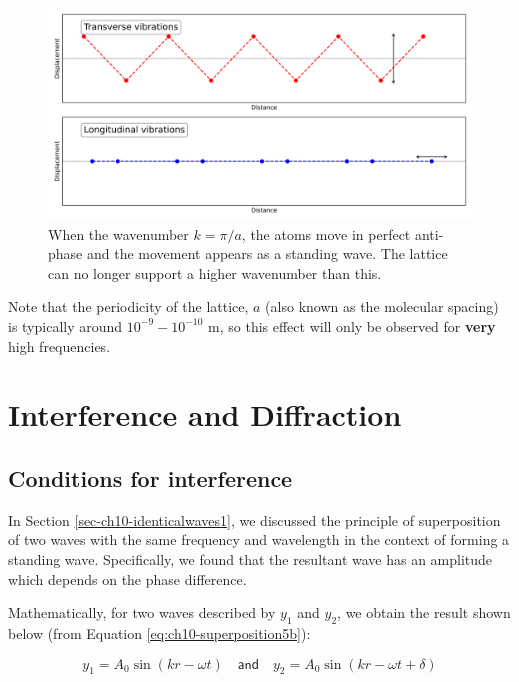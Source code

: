 \documentclass[
]{book}
\begin{document}
\begin{figure}

{\centering \includegraphics[width=0.7\linewidth]{visualisations/ch12-phonons2} 

}

\caption{When the wavenumber $k = \pi / a$, the atoms move in perfect anti-phase and the movement appears as a standing wave. The lattice can no longer support a higher wavenumber than this.}\label{fig:ch12-dispersionlattice1}
\end{figure}

Note that the periodicity of the lattice, \(a\) (also known as the molecular spacing) is typically around \(10^{-9} - 10^{-10}\) m, so this effect will only be observed for \textbf{very} high frequencies.

\hypertarget{sec-ch13-interference}{%
\chapter{Interference and Diffraction}\label{sec-ch13-interference}}

\hypertarget{sec-ch13-conditionsinterference}{%
\section{Conditions for interference}\label{sec-ch13-conditionsinterference}}

In Section \ref{sec-ch10-identicalwaves1}, we discussed the principle of superposition of two waves with the same frequency and wavelength in the context of forming a standing wave. Specifically, we found that the resultant wave has an amplitude which depends on the phase difference.

Mathematically, for two waves described by \(y_1\) and \(y_2\), we obtain the result shown below (from Equation \eqref{eq:ch10-superposition5b}):

\begin{equation}
y_1 = A_0 \sin(k r - \omega t) \quad \textsf{and} \quad y_2 = A_0 \sin(k r - \omega t + \delta)
\end{equation}
\end{document}

